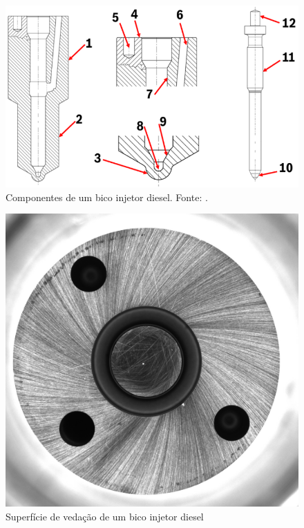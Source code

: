 \documentclass[conference]{IEEEtran}
\begin{document}
\begin{figure}[t]
	\centering
	\includegraphics[scale=0.35]{Images/bico-injetor.png}
	\caption{Componentes de um bico injetor diesel. Fonte: \cite{Girotto2023}.}
	\label{fig:bico-injetor}
\end{figure}

\begin{figure}[t]
	\centering
	\includegraphics[scale=0.10]{Images/superficie-de-vedacao.jpg}
	\caption{Superfície de vedação de um bico injetor diesel}
	\label{fig:superficie-de-vedacao}
\end{figure}
\end{document}
